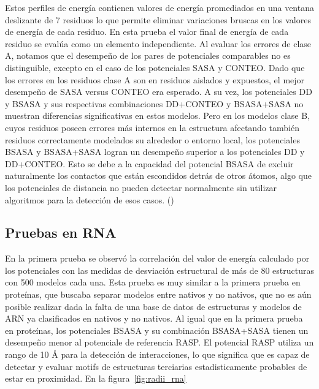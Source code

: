 Estos perfiles de energía contienen valores de energía promediados en una ventana deslizante de 7 residuos lo que permite eliminar variaciones bruscas en los valores de energía de cada residuo.
En esta prueba el valor final de energía de cada residuo se evalúa como un elemento independiente.
Al evaluar los errores de clase A, notamos que el desempeño de los pares de potenciales comparables no es distinguible, excepto en el caso de los potenciales SASA y CONTEO.
Dado que los errores en los residuos clase A son en residuos aislados y expuestos, el mejor desempeño de SASA versus CONTEO era esperado.
A su vez, los potenciales DD y BSASA y sus respectivas combinaciones DD+CONTEO y BSASA+SASA no muestran diferencias significativas en estos modelos.
Pero en los modelos clase B, cuyos residuos poseen errores más internos en la estructura afectando también residuos correctamente modelados su alrededor o entorno local, los potenciales BSASA y BSASA+SASA logran un desempeño superior a los potenciales DD y DD+CONTEO.
Esto se debe a la capacidad del potencial BSASA de excluir naturalmente los contactos que están escondidos detrás de otros átomos, algo que los potenciales de distancia no pueden detectar normalmente sin utilizar algoritmos para la detección de esos casos. (\cite{Ferrada2007,Ferrada2009})

\subsection{Pruebas en RNA}
En la primera prueba se observó la correlación del valor de energía calculado por los potenciales con las medidas de desviación estructural de más de 80 estructuras con 500 modelos cada una.
Esta prueba es muy similar a la primera prueba en proteínas, que buscaba separar modelos entre nativos y no nativos, que no es aún posible realizar dada la falta de una base de datos de estructuras y modelos de ARN ya clasificados en nativos y no nativos.
Al igual que en la primera prueba en proteínas, los potenciales BSASA y su combinación BSASA+SASA tienen un desempeño menor al potenciale de referencia RASP.
El potencial RASP utiliza un rango de 10 \si{\angstrom} para la detección de interacciones, lo que significa que es capaz de detectar y evaluar motifs de estructuras terciarias estadisticamente probables de estar en proximidad.
En la figura~\ref{fig:radii_rna}
